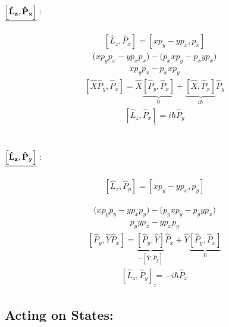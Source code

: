 \documentclass{article}
\begin{document}
    
\subsection*{$\bf\underline{\left[\hat{L}_z, \hat{P}_x\right]}:$}
\begin{align}
\left[\hat{L}_z, \hat{P}_x\right] = \left[xp_y - yp_x, p_x\right]
\end{align}
\begin{align}
\Big(xp_yp_x - yp_xp_x\Big) - \Big(p_x x p_y - p_x y p_x\Big)
\end{align}
\begin{align}
x p_y p_x - p_x x p_y
\end{align}
\begin{align}
\left[\hat{X}\hat{P}_y, \hat{P}_x\right] = \hat{X} \underbrace{\left[\hat{P}_y, \hat{P}_x\right]}_{0} + \underbrace{\left[\hat{X}, \hat{P}_x\right]}_{iℏ}\hat{P}_y
\end{align}
\begin{align}
\underline{\underline{\left[\hat{L}_z, \hat{P}_x\right] =  iℏ\hat{P}_y}}
\end{align}

\subsection*{$\bf\underline{\left[\hat{L}_z, \hat{P}_y\right]}:$}
\begin{align}
\left[\hat{L}_z, \hat{P}_y\right] = \left[xp_y - yp_x, p_y\right]
\end{align}

\begin{align}
\Big(x p_y p_y - y p_x p_y\Big) - \Big(p_y x p_y - p_y y p_x\Big)
\end{align}
\begin{align}
p_y y p_x - y p_x p_y
\end{align}
\begin{align}
\left[\hat{P}_y, \hat{Y}\hat{P}_x\right] = \underbrace{\left[\hat{P}_y, \hat{Y}\right]}_{-[\hat{Y},\hat{P}_y]}\hat{P}_x + \hat{Y}\underbrace{\left[\hat{P}_y, \hat{P}_x\right]}_{0}
\end{align}
\begin{align}
\underline{\underline{\left[\hat{L}_z, \hat{P}_y\right] = -iℏ\hat{P}_x}} 
\end{align}

\subsection*{Acting on States:}
\end{document}
